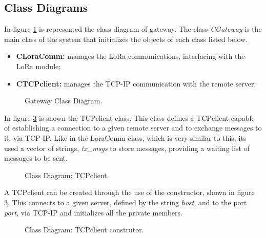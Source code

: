 \subsection{Class Diagrams}
In figure \ref{fig:GwclassDiag} is represented the class diagram of gateway. The class \textit{CGateway} is the main class of the system that initializes the objects of each class listed below.

\begin{itemize}
	\item \textbf{CLoraComm:} manages the LoRa communications, interfacing with the LoRa module;
	
	\item \textbf{CTCPclient:} manages the TCP-IP communication with the remote server;
\end{itemize}

\begin{figure}[H]
	\centering
	\caption{Gateway Class Diagram.}
	\label{fig:GwclassDiag}
\end{figure}


In figure \ref{fig:TCPclient} is shown the TCPclient class. This class defines a TCPclient capable of establishing a connection to a given remote server and to exchange messages to it, via TCP-IP. Like in the LoraComm class, which is very similar to this, its used a vector of strings, \textit{tx\_msgs} to store messages, providing a waiting list of messages to be sent.

\begin{figure}[H]
	\centering
	\caption{Class Diagram: TCPclient.}
	\label{fig:TCPclientClass}
\end{figure}

A TCPclient can be created through the use of the constructor, shown in figure \ref{fig:TCPclient}. This connects to a given server, defined by the string \textit{host}, and to the port \textit{port}, via TCP-IP and initializes all the private members.

\begin{figure}[H]
	\centering
	\caption{Class Diagram: TCPclient construtor.}
	\label{fig:TCPclient}
\end{figure}


